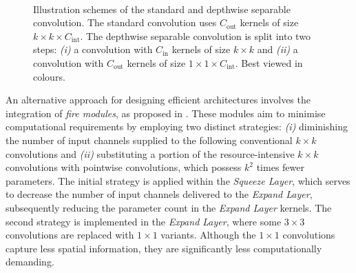 \begin{figure}[htbp]
\centering
{}\\
    \vspace{1cm}
    \caption{Illustration schemes of the standard and depthwise separable
    convolution. The standard convolution uses $C_\text{out}$ kernels of size
    $k\times k \times C_\text{int}$. The depthwise separable convolution is
    split into two steps: \emph{(i)}   a convolution with $C_\text{in}$ kernels
    of size $k \times k$ and \emph{(ii)} a convolution with $C_\text{out}$
    kernels of size $1\times 1 \times C_\text{int}$.
    Best viewed in colours.}
\label{fig:sota:depthwise_conv_vs_standard_conv}
\end{figure}


An alternative approach for designing efficient architectures involves the
integration of \emph{fire modules}, as proposed in
\cite{DBLP:journals/corr/IandolaMAHDK16}. These modules aim to minimise
computational requirements by employing two distinct strategies: \emph{(i)}
diminishing the number of input channels supplied to the following conventional
$k\times k$ convolutions and \emph{(ii)} substituting a portion of the
resource-intensive $k\times k$ convolutions with pointwise convolutions, which
possess $k^2$ times fewer parameters. The initial strategy is applied within the
\emph{Squeeze Layer}, which serves to decrease the number of input channels
delivered to the \emph{Expand Layer}, subsequently reducing the parameter count
in the \emph{Expand Layer} kernels. The second strategy is implemented in the
\emph{Expand Layer}, where some $3\times3$ convolutions are replaced with
$1\times1$ variants. Although the $1\times1$ convolutions capture less spatial
information, they are significantly less computationally demanding.\\

